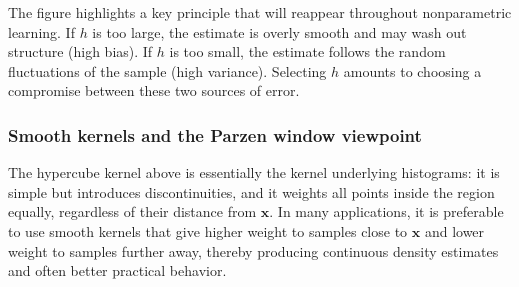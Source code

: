 \begin{figure}[h]
\end{figure}

The figure highlights a key principle that will reappear throughout nonparametric learning. If \(h\) is too large, the estimate is overly smooth and may wash out structure (high bias). If \(h\) is too small, the estimate follows the random fluctuations of the sample (high variance). Selecting \(h\) amounts to choosing a compromise between these two sources of error.

\medskip

\subsubsection*{Smooth kernels and the Parzen window viewpoint}

The hypercube kernel above is essentially the kernel underlying histograms: it is simple but introduces discontinuities, and it weights all points inside the region equally, regardless of their distance from \(\mathbf{x}\). In many applications, it is preferable to use \alert{smooth kernels} that give higher weight to samples close to \(\mathbf{x}\) and lower weight to samples further away, thereby producing continuous density estimates and often better practical behavior.

